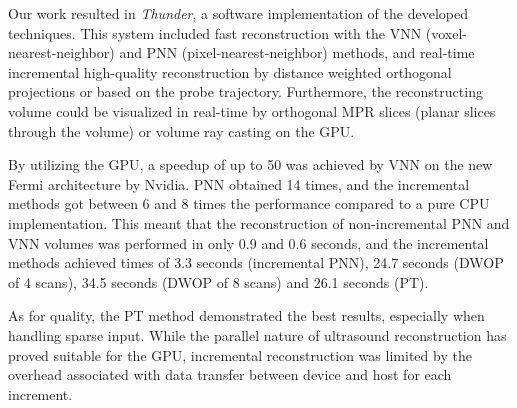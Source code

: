 
Our work resulted in \emph{Thunder}, a software implementation of the developed techniques. This system included fast reconstruction with the VNN (voxel-nearest-neighbor) and PNN (pixel-nearest-neighbor) methods, and real-time incremental high-quality reconstruction by distance weighted orthogonal projections or based on the probe trajectory. Furthermore, the reconstructing volume could be visualized in real-time by orthogonal MPR slices (planar slices through the volume) or volume ray casting on the GPU.

By utilizing the GPU, a speedup of up to 50 was achieved by VNN on the new Fermi architecture by Nvidia. PNN obtained 14 times, and the incremental methods got between 6 and 8 times the performance compared to a pure CPU implementation. This meant that the reconstruction of non-incremental PNN and VNN volumes was performed in only 0.9 and 0.6 seconds, and the incremental methods achieved times of 3.3 seconds (incremental PNN), 24.7 seconds (DWOP of 4 scans), 34.5 seconds (DWOP of 8 scans) and 26.1 seconds (PT).

As for quality, the PT method demonstrated the best results, especially when handling sparse input. While the parallel nature of ultrasound reconstruction has proved suitable for the GPU, incremental reconstruction was limited by the overhead associated with data transfer between device and host for each increment.


